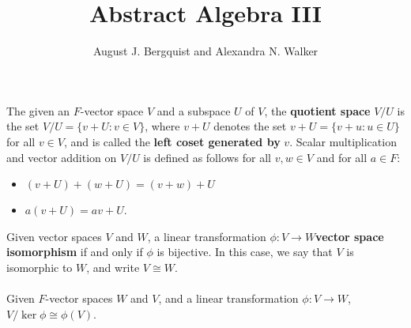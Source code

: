 \documentclass{article}
\title{Abstract Algebra III}
\author{August J. Bergquist and Alexandra N. Walker}
\begin{document}
\maketitle

 The given an $F$-vector space $V$ and a subspace $U$ of $V$, the \textbf{quotient space} $V/U$ is the set $V/U = \{v + U: v\in V\}$, where $v+U$ denotes the set $v+ U = \{v + u: u\in U\}$ for all $v\in V$, and is called the \textbf{left coset generated by} $v$. Scalar multiplication and vector addition on $V/U$ is defined as follows for all $v,w\in V$ and for all $a\in F$:

\begin{itemize}
    \item $(v+ U)+(w+U) = (v+w) + U$
    \item $a(v+ U) = av + U$.
\end{itemize}

 Given vector spaces $V$ and $W$, a linear transformation $\phi:V \rightarrow W$\textbf{vector space isomorphism} if and only if $\phi$ is bijective. In this case, we say that $V$ is isomorphic to $W$, and write $V\cong W$.\\



\\

Given $F$-vector spaces $W$ and $V$, and a linear transformation $\phi: V\rightarrow W$, $V/\ker\phi\cong \phi(V)$.\\
\end{document}
